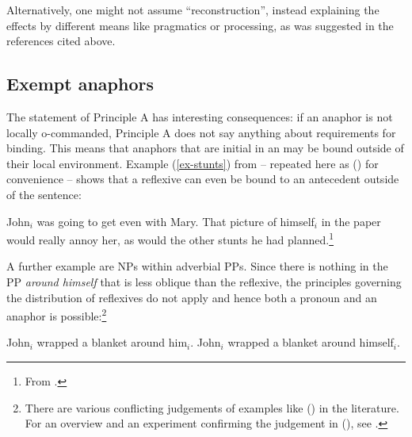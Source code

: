 \documentclass[output=paper,biblatex,babelshorthands,newtxmath,draftmode,colorlinks,citecolor=brown]{langscibook}
\begin{document}
{Alternatively, one might not assume ``reconstruction'', instead explaining the effects by different means
like pragmatics or processing, as was suggested in the references cited above.
}

\subsection{Exempt anaphors}
\label{sec-excempt-anaphors}\label{binding:sec-excempt-anaphors}


The statement of Principle A has interesting consequences: if an anaphor is not locally o-commanded,
Principle A does not say anything about requirements for binding. This means that anaphors that are
initial in an \argstl may be bound outside of their local environment. Example (\ref{ex-stunts}) from
\citet[]{ps2} -- repeated here as () for convenience -- shows that a reflexive can even be bound to an antecedent outside of the sentence:

\eanoraggedright
John$_i$ was going to get even with Mary. That picture of himself$_i$
in the paper would really annoy her, as would the other stunts he had planned.\footnote{
        From .
}
\z

\noindent
A further example are NPs within adverbial PPs. Since there is nothing in the PP \emph{around
  himself} that is less oblique than the reflexive, the principles governing the distribution of
reflexives do not apply and hence both a pronoun and an anaphor is possible:\footnote{
  There are various conflicting judgements of examples like () in the literature. For an
  overview and an experiment confirming the judgement in (), see .
}

\eal
\label{ex-john-wrapped-a-blanket-around-him}
\ex John$_i$ wrapped a blanket around him$_i$.
\ex John$_i$ wrapped a blanket around himself$_i$.
\zl
{}
\end{document}
